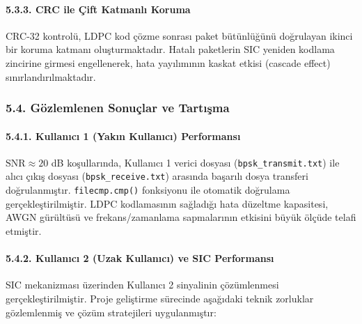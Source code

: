 \documentclass[
]{IEEEtran}
\begin{document}
\paragraph{5.3.3. CRC ile Çift Katmanlı
Koruma}\label{crc-ile-uxe7ift-katmanlux131-koruma}

CRC-32 kontrolü, LDPC kod çözme sonrası paket bütünlüğünü doğrulayan
ikinci bir koruma katmanı oluşturmaktadır. Hatalı paketlerin SIC yeniden
kodlama zincirine girmesi engellenerek, hata yayılımının kaskat etkisi
(cascade effect) sınırlandırılmaktadır.

\subsubsection{5.4. Gözlemlenen Sonuçlar ve
Tartışma}\label{guxf6zlemlenen-sonuuxe7lar-ve-tartux131ux15fma}

\paragraph{5.4.1. Kullanıcı 1 (Yakın Kullanıcı)
Performansı}\label{kullanux131cux131-1-yakux131n-kullanux131cux131-performansux131}

\(\text{SNR} \approx 20\) dB koşullarında, Kullanıcı 1 verici dosyası
(\texttt{bpsk\_transmit.txt}) ile alıcı çıkış dosyası
(\texttt{bpsk\_receive.txt}) arasında başarılı dosya transferi
doğrulanmıştır. \texttt{filecmp.cmp()} fonksiyonu ile otomatik doğrulama
gerçekleştirilmiştir. LDPC kodlamasının sağladığı hata düzeltme
kapasitesi, AWGN gürültüsü ve frekans/zamanlama sapmalarının etkisini
büyük ölçüde telafi etmiştir.

\paragraph{5.4.2. Kullanıcı 2 (Uzak Kullanıcı) ve SIC
Performansı}\label{kullanux131cux131-2-uzak-kullanux131cux131-ve-sic-performansux131}

SIC mekanizması üzerinden Kullanıcı 2 sinyalinin çözümlenmesi
gerçekleştirilmiştir. Proje geliştirme sürecinde aşağıdaki teknik
zorluklar gözlemlenmiş ve çözüm stratejileri uygulanmıştır:
\end{document}
